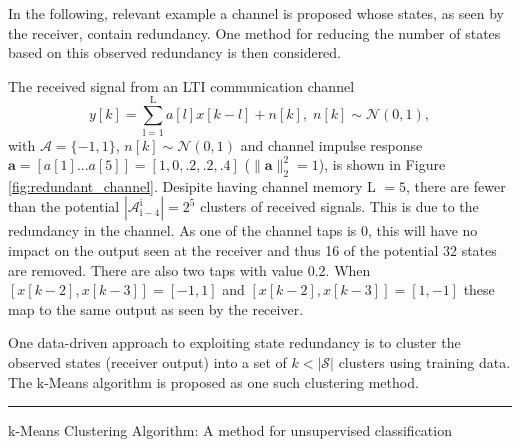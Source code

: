 In the following, relevant example a channel is proposed whose states, as seen by the receiver, contain redundancy. One method for reducing the number of states based on this observed redundancy is then considered. 

The received signal from an LTI communication channel
\begin{equation*}
y[k] = \sum_{\mathrm{l=1}}^{\mathrm{L}} a[l]x[k-l] + n[k], \; n[k]  \sim \mathcal{N}(0,1),
\end{equation*}
with  $\mathcal{A}=\{-1, 1\}$, $n[k]  \sim \mathcal{N}(0,1)$ and 
channel impulse response $\mathbf{a} = [a[1]...a[5]]=[1, 0, .2, .2, .4]$ ($\|\mathbf{a}\|^2_2 = 1$),  is shown in Figure \ref{fig:redundant_channel}. Desipite having channel memory L $=5$, there are fewer than the potential $|\mathcal{A}_{\mathrm{i-4}}^{\mathrm{i}}| =2^5$ clusters of received signals. This is due to the redundancy in the channel.  As one of the channel taps is 0, this will have no impact on the output seen at the receiver and thus 16 of the potential 32 states are removed. There are also two taps with value 0.2. When $\left[x[k-2],x[k-3]\right] = [-1,1]$ and $\left[x[k-2],x[k-3]\right] = [1,-1]$ these map to the same output as seen by the receiver. 


\par
One data-driven approach to exploiting state redundancy is to cluster the observed states (receiver output) into a set of $k<|\mathcal{S}|$ clusters using training data. The k-Means algorithm is proposed as one such clustering method.
\\

    \noindent\rule[16pt]{\textwidth}{0.6pt}
k-Means Clustering Algorithm: A method for unsupervised classification


